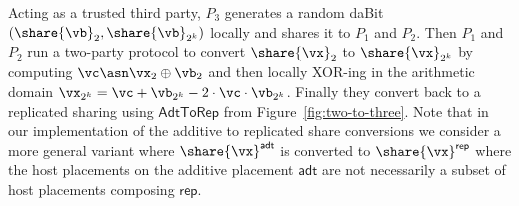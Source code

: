 Acting as a trusted third party, $P_3$ generates a random daBit $(\share{\vb}_2,
\share{\vb}_{2^k})$ locally and shares it to $P_1$ and $P_2$. Then $P_1$ and
$P_2$ run a two-party protocol to convert $\share{\vx}_2$ to $\share{\vx}_{2^k}$
by computing $\vc \asn \vx_2 \oplus \vb_2$ and then locally XOR-ing in the
arithmetic domain $\vx_{2^k} = \vc + \vb_{2^k} - 2 \cdot \vc \cdot \vb_{2^k}$.
Finally they convert back to a replicated sharing using
$\mathsf{AdtToRep}$ from Figure~\ref{fig:two-to-three}. Note that in our
implementation of the additive to replicated share conversions we consider a
more general variant where $\share{\vx}^\mathsf{adt}$ is converted to
$\share{\vx}^\mathsf{rep}$ where the host placements on the additive placement
$\mathsf{adt}$ are not necessarily a subset of host placements composing $\mathsf{rep}$.



% 
